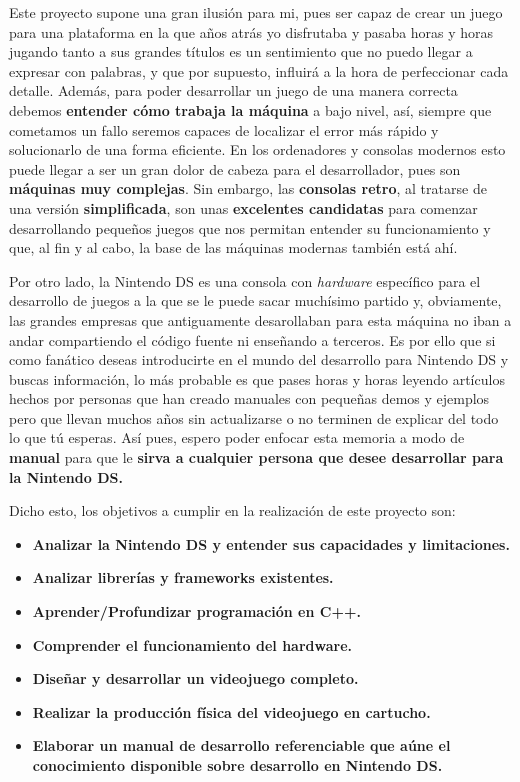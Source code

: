 \vspace{0.5cm}

Este proyecto supone una gran ilusión para mi, pues ser capaz de crear un juego para una plataforma en la que años atrás yo disfrutaba y pasaba horas y horas jugando tanto a sus grandes títulos es un sentimiento que no puedo llegar a expresar con palabras, y que por supuesto, influirá a la hora de perfeccionar cada detalle. Además, para poder desarrollar un juego de una manera correcta debemos \textbf{entender cómo trabaja la máquina} a bajo nivel, así, siempre que cometamos un fallo seremos capaces de localizar el error más rápido y solucionarlo de una forma eficiente. En los ordenadores y consolas modernos esto puede llegar a ser un gran dolor de cabeza para el desarrollador, pues son \textbf{máquinas muy complejas}. Sin embargo, las \textbf{consolas retro}, al tratarse de una versión \textbf{simplificada}, son unas \textbf{excelentes candidatas} para comenzar desarrollando pequeños juegos que nos permitan entender su funcionamiento y que, al fin y al cabo, la base de las máquinas modernas también está ahí.

\vspace{0.5cm}

Por otro lado, la Nintendo DS es una consola con \textit{hardware} específico para el desarrollo de juegos a la que se le puede sacar muchísimo partido y, obviamente, las grandes empresas que antiguamente desarollaban para esta máquina no iban a andar compartiendo el código fuente ni enseñando a terceros. Es por ello que si como fanático deseas introducirte en el mundo del desarrollo para Nintendo DS y buscas información, lo más probable es que pases horas y horas leyendo artículos hechos por personas que han creado manuales con pequeñas demos y ejemplos pero que llevan muchos años sin actualizarse o no terminen de explicar del todo lo que tú esperas. Así pues, espero poder enfocar esta memoria a modo de \textbf{manual} para que le \textbf{sirva a cualquier persona que desee desarrollar para la Nintendo DS.}

\vspace{0.5cm}

Dicho esto, los objetivos a cumplir en la realización de este proyecto son:

\begin{itemize}
   \item \textbf{Analizar la Nintendo DS y entender sus capacidades y limitaciones.}
   \item  \textbf{Analizar librerías y frameworks existentes.}
    \item \textbf{Aprender/Profundizar programación en C++.}
    \item \textbf{Comprender el funcionamiento del hardware.}
     \item  \textbf{Diseñar y desarrollar un videojuego completo.}
     \item \textbf{Realizar la producción física del videojuego en cartucho.}
     \item \textbf{Elaborar un manual de desarrollo referenciable que aúne el conocimiento disponible sobre desarrollo en Nintendo DS.}
\end{itemize}


